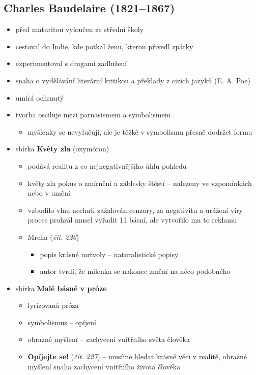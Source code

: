 \subsection{Charles Baudelaire (1821--1867)}
\begin{itemize}
\item před maturitou vyloučen ze střední školy
\item cestoval do Indie, kde potkal ženu, kterou přivedl zpátky
\item experimentoval s drogami \ra zadlužení
\item snaha o vydělávání literární kritikou a překlady z cizích jazyků (E. A. Poe)
\item umírá ochrnutý
\item tvorba osciluje mezi parnasismem a symbolismem
	\begin{itemize}
	\item myšlenky se nevylučují, ale je těžké v symbolismu přesně dodržet formu
	\end{itemize}
\item sbírka \textbf{Květy zla} (oxymóron)
	\begin{itemize}
	\item podává realitu z co nejnegativnějšího úhlu pohledu
	\item květy zla \ra pokus o zmírnění a záblesky štěstí -- nalezeny ve vzpomínkách nebo v umění
	\item vzbudilo vlnu nechuti \ra zažalován cenzory, za negativitu a urážení víry \ra proces prohrál \ra musel vyřadit 11 básní, ale vytvořilo mu to reklamu
	\item Mrcha (\textit{čít. 226})
		\begin{itemize}
		\item popis krásné mrtvoly -- naturalistické popisy 
		\item autor tvrdí, že milenka se nakonec změní na něco podobného
		\end{itemize}
	\end{itemize}
\item sbírka \textbf{Malé básně v próze}
	\begin{itemize}
	\item lyrizovaná próza 
	\item symbolismus -- opíjení 
	\item obrazné myšlení -- zachycení vnitřního světa člověka 
	\item \textbf{Opíjejte se!} (\textit{čít. 227}) -- musíme hledat krásné věci v realitě, obrazné myšlení snaha zachycení vnitřního života člověka
	\end{itemize}
\end{itemize}


